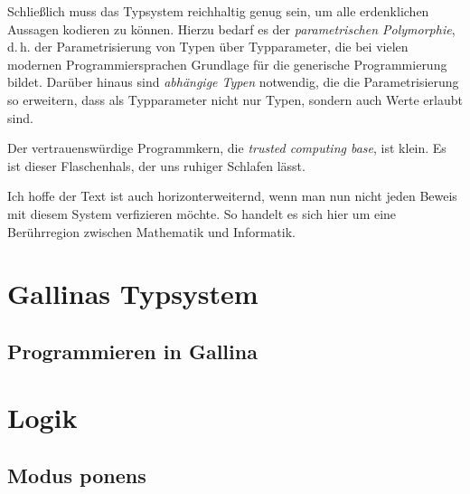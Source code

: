 \documentclass[a4paper,10pt,fleqn,twocolumn,twoside,dvipdfmx]{scrartcl}
\numberwithin{equation}{section}
\begin{document}
Schließlich muss das Typsystem reichhaltig genug sein, um alle
erdenklichen Aussagen kodieren zu können. Hierzu bedarf es der
\emph{parametrischen Polymorphie}, d.\,h. der Parametrisierung
von Typen über Typparameter, die bei vielen modernen
Programmiersprachen Grundlage für die generische Programmierung
bildet. Darüber hinaus sind \emph{abhängige Typen} notwendig, die die
Parametrisierung so erweitern, dass als Typparameter nicht nur Typen,
sondern auch Werte erlaubt sind.

Der vertrauenswürdige Programmkern, die \emph{trusted computing base},
ist klein. Es ist dieser Flaschenhals, der uns ruhiger Schlafen lässt.

Ich hoffe der Text ist auch horizonterweiternd, wenn man nun nicht
jeden Beweis mit diesem System verfizieren möchte. So handelt es
sich hier um eine Berührregion zwischen Mathematik und Informatik.

\section{Gallinas Typsystem}
\subsection{Programmieren in Gallina}

\section{Logik}

\subsection{Modus ponens}
\end{document}
